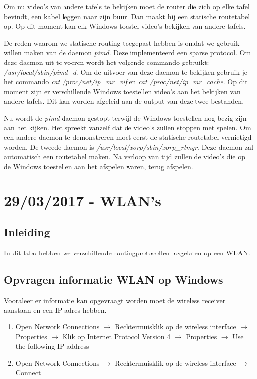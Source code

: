 \documentclass{report}
\begin{document}
Om nu video's van andere tafels te bekijken moet de router die zich op elke tafel bevindt, een kabel leggen naar zijn buur. Dan maakt hij een statische routetabel op. Op dit moment kan elk Windows toestel video's bekijken van andere tafels. 

De reden waarom we statische routing toegepast hebben is omdat we gebruik willen maken van de daemon \textit{pimd}. Deze implementeerd een sparse protocol. Om deze daemon uit te voeren wordt het volgende commando gebruikt: \textit{/usr/local/sbin/pimd -d}. Om de uitvoer van deze daemon te bekijken gebruik je het commando \textit{cat /proc/net/ip\_mr\_vif} en \textit{cat /proc/net/ip\_mr\_cache}. Op dit moment zijn er verschillende Windows toestellen video's aan het bekijken van andere tafels. Dit kan worden afgeleid aan de output van deze twee bestanden. 

Nu wordt de \textit{pimd} daemon gestopt terwijl de Windows toestellen nog bezig zijn aan het kijken. Het spreekt vanzelf dat de video's zullen stoppen met spelen.
Om een andere daemon te demonstreren moet eerst de statische routetabel vernietigd worden. De tweede daemon is \textit{/usr/local/xorp/sbin/xorp\_rtmgr}. Deze daemon zal automatisch een routetabel maken. Na verloop van tijd zullen de video's die op de Windows toestellen aan het afspelen waren, terug afspelen.


\chapter{29/03/2017 - WLAN's}
\section{Inleiding}
In dit labo hebben we verschillende routingprotocollen losgelaten op een WLAN. 


\section{Opvragen informatie WLAN op Windows}
Vooraleer er informatie kan opgevraagt worden moet de wireless receiver aanstaan en een IP-adres hebben.
\begin{enumerate}
	\item Open Network Connections $\rightarrow$ Rechtermuisklik op de wireless interface $\rightarrow$ Properties $\rightarrow$ Klik op Internet Protocol Version 4 $\rightarrow$ Properties $\rightarrow$ Use the following IP address
	\item Open Network Connections $\rightarrow$ Rechtermuisklik op de wireless interface $\rightarrow$ Connect
\end{enumerate}
\end{document}
